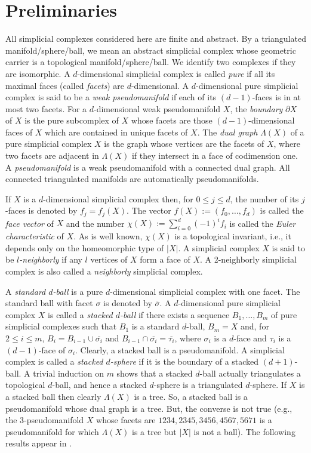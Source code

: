 \documentclass[11pt]{article}
\begin{document}
\section{Preliminaries}


All simplicial complexes considered here are finite and abstract.
By a triangulated manifold/sphere/ball, we mean an abstract
simplicial complex whose geometric carrier is a topological
manifold/sphere/ball. We identify two complexes if they are
isomorphic. A $d$-dimensional simplicial complex is called {\em
pure} if all its maximal faces (called {\em facets}) are
$d$-dimensional. A $d$-dimensional pure simplicial complex is said
to be a {\em weak pseudomanifold} if each of its $(d - 1)$-faces
is in at most two facets. For a $d$-dimensional weak
pseudomanifold $X$, the {\em boundary} $\partial X$ of $X$ is the
pure subcomplex of $X$ whose facets are those $(d-1)$-dimensional
faces of $X$ which are contained in unique facets of $X$. The {\em
dual graph} $\Lambda(X)$ of a pure simplicial complex $X$ is the
graph whose vertices are the facets of $X$, where two facets are
adjacent in $\Lambda(X)$ if they intersect in a face of
codimension one. A {\em pseudomanifold} is a weak pseudomanifold
with a connected dual graph. All connected triangulated manifolds
are automatically pseudomanifolds.


If $X$ is a $d$-dimensional simplicial complex then, for $0\leq j
\leq d$, the number of its $j$-faces is denoted by $f_j = f_j(X)$.
The vector $f(X) := (f_0, \dots, f_d)$ is called the {\em face
vector} of $X$ and the number $\chi(X) := \sum_{i=0}^{d} (-1)^i
f_i$ is called the {\em Euler characteristic} of $X$. As is well
known, $\chi(X)$ is a topological invariant, i.e., it depends only
on the homeomorphic type of $|X|$. A simplicial complex $X$ is
said to be {\em $l$-neighborly} if any $l$ vertices of $X$ form a
face of $X$. A 2-neighborly simplicial complex is also called a
{\em neighborly} simplicial complex.

A {\em standard $d$-ball} is a pure $d$-dimensional simplicial
complex with one facet. The standard ball with facet $\sigma$ is
denoted by $\overline{\sigma}$. A $d$-dimensional pure simplicial
complex $X$ is called a {\em stacked $d$-ball} if there exists a
sequence $B_1, \dots, B_m$ of pure simplicial complexes such that
$B_1$ is a standard $d$-ball, $B_m=X$ and, for $2\leq i\leq m$,
$B_i = B_{i-1}\cup \overline{\sigma_i}$ and $B_{i-1} \cap
\overline{\sigma_i} = \overline{\tau_i}$, where $\sigma_i$ is a
$d$-face and $\tau_i$ is a $(d-1)$-face of $\sigma_i$. Clearly, a
stacked ball is a pseudomanifold. A simplicial complex is called a
{\em stacked $d$-sphere} if it is the boundary of a stacked
$(d+1)$-ball. A trivial induction on $m$ shows that a stacked
$d$-ball actually triangulates a topological $d$-ball, and hence a
stacked $d$-sphere is a triangulated $d$-sphere. If $X$ is a
stacked ball then clearly $\Lambda(X)$ is a tree. So, a stacked ball
is a pseudomanifold whose dual graph is a tree. But, the converse
is not true (e.g., the 3-pseudomanifold $X$ whose facets are
$1234, 2345, 3456, 4567, 5671$ is a pseudomanifold for which
$\Lambda(X)$ is a tree but $|X|$ is not a ball). The following results appear
in \cite{bdns}.
\end{document}
